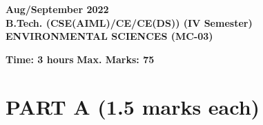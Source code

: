 \documentclass[12pt,a4paper]{article}
\begin{document}
\pagecolor{pagecolor}

\begin{center}
    \textbf{Aug/September 2022} \\
    \textbf{B.Tech. (CSE(AIML)/CE/CE(DS)) (IV Semester)} \\
    \textbf{ENVIRONMENTAL SCIENCES (MC-03)}
\end{center}

\vspace{1em}

\noindent \textbf{Time: 3 hours} \hfill \textbf{Max. Marks: 75}

\vspace{1em}

\section*{\textbf{PART A (1.5 marks each)}}
\end{document}
